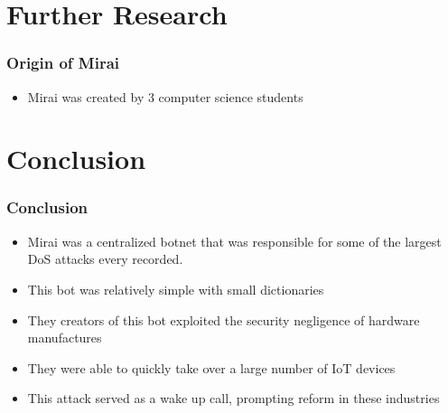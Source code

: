 \documentclass{beamer}
\begin{document}
\section{Further Research}

\begin{frame}
	\frametitle{Origin of Mirai}
	\begin{itemize}
		\item<+-> Mirai was created by 3 computer science students
	\end{itemize}
\end{frame}

\section{Conclusion}

\begin{frame}
	\frametitle{Conclusion}
	\begin{itemize}
		\item<+-> Mirai was a centralized botnet that was responsible for some of the largest DoS attacks every recorded.
		\item<+-> This bot was relatively simple with small dictionaries
		\item<+-> They creators of this bot exploited the security negligence of hardware manufactures
		\item<+-> They were able to quickly take over a large number of IoT devices
		\item<+-> This attack served as a wake up call, prompting reform in these industries
	\end{itemize}
\end{frame}
\end{document}
